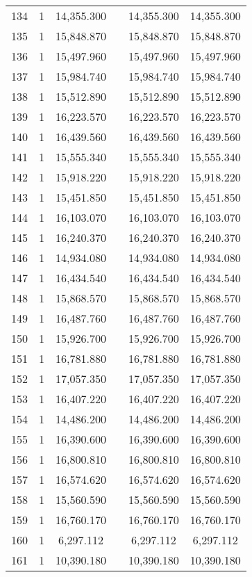 \begin{table}[!htbp]
\begin{tabular}{@{\extracolsep{5pt}}lccccc}
134 & 1 & 14,355.300 &  & 14,355.300 & 14,355.300 \\ 
135 & 1 & 15,848.870 &  & 15,848.870 & 15,848.870 \\ 
136 & 1 & 15,497.960 &  & 15,497.960 & 15,497.960 \\ 
137 & 1 & 15,984.740 &  & 15,984.740 & 15,984.740 \\ 
138 & 1 & 15,512.890 &  & 15,512.890 & 15,512.890 \\ 
139 & 1 & 16,223.570 &  & 16,223.570 & 16,223.570 \\ 
140 & 1 & 16,439.560 &  & 16,439.560 & 16,439.560 \\ 
141 & 1 & 15,555.340 &  & 15,555.340 & 15,555.340 \\ 
142 & 1 & 15,918.220 &  & 15,918.220 & 15,918.220 \\ 
143 & 1 & 15,451.850 &  & 15,451.850 & 15,451.850 \\ 
144 & 1 & 16,103.070 &  & 16,103.070 & 16,103.070 \\ 
145 & 1 & 16,240.370 &  & 16,240.370 & 16,240.370 \\ 
146 & 1 & 14,934.080 &  & 14,934.080 & 14,934.080 \\ 
147 & 1 & 16,434.540 &  & 16,434.540 & 16,434.540 \\ 
148 & 1 & 15,868.570 &  & 15,868.570 & 15,868.570 \\ 
149 & 1 & 16,487.760 &  & 16,487.760 & 16,487.760 \\ 
150 & 1 & 15,926.700 &  & 15,926.700 & 15,926.700 \\ 
151 & 1 & 16,781.880 &  & 16,781.880 & 16,781.880 \\ 
152 & 1 & 17,057.350 &  & 17,057.350 & 17,057.350 \\ 
153 & 1 & 16,407.220 &  & 16,407.220 & 16,407.220 \\ 
154 & 1 & 14,486.200 &  & 14,486.200 & 14,486.200 \\ 
155 & 1 & 16,390.600 &  & 16,390.600 & 16,390.600 \\ 
156 & 1 & 16,800.810 &  & 16,800.810 & 16,800.810 \\ 
157 & 1 & 16,574.620 &  & 16,574.620 & 16,574.620 \\ 
158 & 1 & 15,560.590 &  & 15,560.590 & 15,560.590 \\ 
159 & 1 & 16,760.170 &  & 16,760.170 & 16,760.170 \\ 
160 & 1 & 6,297.112 &  & 6,297.112 & 6,297.112 \\ 
161 & 1 & 10,390.180 &  & 10,390.180 & 10,390.180 \\ 

\end{tabular}
\end{table}
